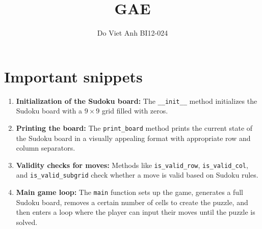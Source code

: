 \documentclass{article}
\title{GAE}
\author{Do Viet Anh BI12-024}
\begin{document}

\section{Important snippets}
\begin{enumerate}
    \item \textbf{Initialization of the Sudoku board:} The \texttt{\_\_init\_\_} method initializes the Sudoku board with a $9 \times 9$ grid filled with zeros.
   
    \item \textbf{Printing the board:} The \texttt{print\_board} method prints the current state of the Sudoku board in a visually appealing format with appropriate row and column separators.
    
    \item \textbf{Validity checks for moves:} Methods like \texttt{is\_valid\_row}, \texttt{is\_valid\_col}, and \texttt{is\_valid\_subgrid} check whether a move is valid based on Sudoku rules.
    
    \item \textbf{Main game loop:} The \texttt{main} function sets up the game, generates a full Sudoku board, removes a certain number of cells to create the puzzle, and then enters a loop where the player can input their moves until the puzzle is solved.
\end{enumerate}
\end{document}
